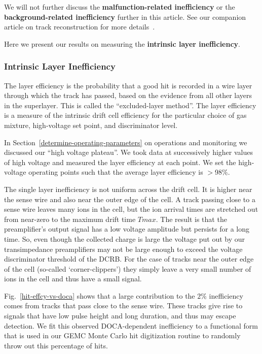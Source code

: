We will not further discuss the {\bf malfunction-related inefficiency} or
the {\bf background-related inefficiency} further in this article.  See
our companion article on track reconstruction for more details~\cite{recon-nim}.

Here we present our results on measuring the {\bf intrinsic layer inefficiency}.

\subsubsection{Intrinsic Layer Inefficiency}

The layer efficiency is the probability that a
good hit is recorded in a wire layer through which the track has passed, based on 
the evidence from all other layers in the superlayer.  This is called the 
``excluded-layer method''.  The layer efficiency is a measure of the intrinsic drift 
cell efficiency for the particular choice of gas mixture, high-voltage set point, and 
discriminator level.  

In Section~\ref{determine-operating-parameters} on operations and monitoring we discussed
our ``high voltage plateau''. We took data at successively higher values of high voltage and measured the
layer efficiency at each point.  We set the high-voltage operating points such that
the average layer efficiency is $>$98$\%$. 

The single layer inefficiency is not uniform across the drift cell.  It is higher near the sense wire and also
near the outer edge of the cell.  A track passing close to a sense wire leaves many ions in the cell, but the
ion arrival times are stretched out from near-zero to the maximum drift time $Tmax$.  The result is that
the preamplifier's output signal has a low voltage amplitude but persists for a long time.  So, even though
the collected charge is large the voltage put out by our transimpedance preamplifiers may not be large
enough to exceed the voltage discriminator threshold of the DCRB. For the case of tracks near the outer
edge of the cell (so-called `corner-clippers') they simply leave a very small number of ions in the cell and
thus have a small signal.

Fig.~\ref{hit-effcy-vs-doca} shows that a large contribution to the $2\%$ inefficiency comes 
from tracks that pass close to the sense wire.  These tracks give rise to signals 
that have low pulse height and long duration, and thus may escape detection.
We fit this observed DOCA-dependent inefficiency to a functional form that is
used in our GEMC Monte Carlo hit digitization routine to randomly throw out
this percentage of hits.

